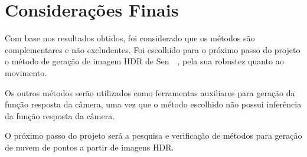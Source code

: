 \chapter{Considerações Finais} \label{conclusao}

Com base nos resultados obtidos, foi considerado que os métodos são complementares e não excludentes. Foi escolhido para o próximo passo do projeto o método de geração de imagem HDR de Sen~\etal~\cite{hdrMovimento}, pela sua robustez quanto ao movimento.

Os outros métodos serão utilizados como ferramentas auxiliares para geração da função resposta da câmera, uma vez que o método escolhido não possui inferência da função resposta da câmera.

O próximo passo do projeto será a pesquisa e verificação de métodos para geração de nuvem de pontos a partir de imagens HDR.
